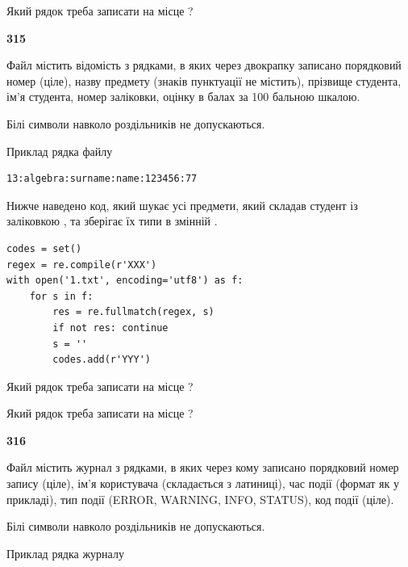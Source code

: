 Який рядок треба записати на місце  ?\par


\newpage

{\begin {center}\textbf{ 315}\end {center}}\par
Файл  містить відомість з рядками, в яких через двокрапку записано поряд\-ковий номер (ціле), назву предмету (знаків пунктуації не містить), прізвище студента, ім'я студента, номер заліковки, оцінку в балах за 100 бальною шкалою.

Білі символи навколо роздільників не допускаються.

Приклад рядка файлу



\begin{verbatim}
13:algebra:surname:name:123456:77
\end{verbatim}


Нижче наведено код, який шукає усі предмети, який складав студент із заліковкою , та зберігає їх типи в змінній .



\begin{verbatim}
codes = set()
regex = re.compile(r'XXX')
with open('1.txt', encoding='utf8') as f:
    for s in f:
        res = re.fullmatch(regex, s)
        if not res: continue
        s = ''
        codes.add(r'YYY')
\end{verbatim}





Який рядок треба записати на місце  ?\par
\vspace{5mm}


Який рядок треба записати на місце  ?\par


\newpage

{\begin {center}\textbf{ 316}\end {center}}\par
Файл  містить журнал з рядками, в яких через кому записано поряд\-ко\-вий номер запису (ціле), ім'я користувача (складається з латиниці), час події (фор\-мат як у прикладі), тип події (ERROR, WARNING, INFO, STATUS), код події (ціле).

Білі символи навколо роздільників не допускаються.

Приклад рядка журналу



